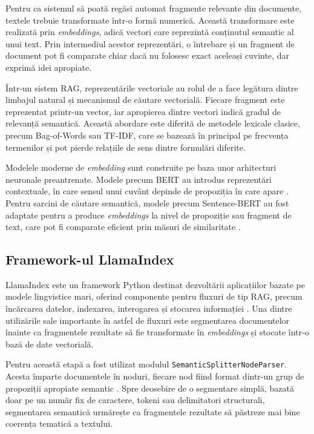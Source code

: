 \documentclass[12pt, a4paper, oneside, romanian]{teza-upb}
\begin{document}
Pentru ca sistemul să poată regăsi automat fragmente relevante din documente, textele trebuie transformate într-o formă numerică. Această transformare este realizată prin \textit{embeddings}, adică vectori care reprezintă conținutul semantic al unui text. Prin intermediul acestor reprezentări, o întrebare și un fragment de document pot fi comparate chiar dacă nu folosesc exact aceleași cuvinte, dar exprimă idei apropiate.

Într-un sistem RAG, reprezentările vectoriale au rolul de a face legătura dintre limbajul natural și mecanismul de căutare vectorială. Fiecare fragment este reprezentat printr-un vector, iar apropierea dintre vectori indică gradul de relevanță semantică. Această abordare este diferită de metodele lexicale clasice, precum Bag-of-Words sau TF-IDF, care se bazează în principal pe frecvența termenilor și pot pierde relațiile de sens dintre formulări diferite.

Modelele moderne de \textit{embedding} sunt construite pe baza unor arhitecturi neuronale preantrenate. Modele precum BERT au introdus reprezentări contextuale, în care sensul unui cuvânt depinde de propoziția în care apare \cite{devlin2018bert}. Pentru sarcini de căutare semantică, modele precum Sentence-BERT au fost adaptate pentru a produce \textit{embeddings} la nivel de propoziție sau fragment de text, care pot fi comparate eficient prin măsuri de similaritate \cite{reimers2019sbert}.


\subsection{Framework-ul LlamaIndex}

LlamaIndex este un framework Python destinat dezvoltării aplicațiilor bazate pe modele lingvistice mari, oferind componente pentru fluxuri de tip RAG, precum încărcarea datelor, indexarea, interogarea și stocarea informației \cite{llamaindex_doc}. Una dintre utilizările sale importante în astfel de fluxuri este segmentarea documentelor înainte ca fragmentele rezultate să fie transformate în \textit{embeddings} și stocate într-o bază de date vectorială.

Pentru această etapă a fost utilizat modulul \texttt{SemanticSplitterNodeParser}. Acesta împarte documentele în noduri, fiecare nod fiind format dintr-un grup de propoziții apropiate semantic \cite{llamaindex_semantic_splitter}. Spre deosebire de o segmentare simplă, bazată doar pe un număr fix de caractere, tokeni sau delimitatori structurali, segmentarea semantică urmărește ca fragmentele rezultate să păstreze mai bine coerența tematică a textului.
\end{document}

